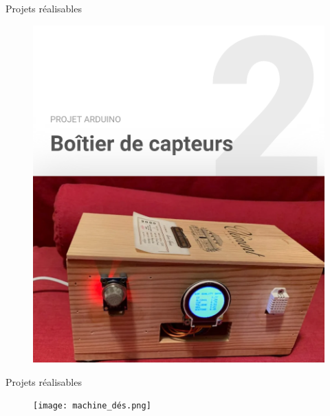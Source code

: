 \documentclass[]{beamer}
\begin{document}
	\begin{frame}
	{Projets réalisables}
			\begin{figure}
				\begin{center}
					\includegraphics[scale=0.4]{boitier_capteur.png}
				\end{center}
			\end{figure}
	\end{frame}
	\begin{frame}
	{Projets réalisables}
			\begin{figure}
				\begin{center}
					\texttt{[image: machine\_dés.png]}
				\end{center}
			\end{figure}
	\end{frame}
\end{document}
